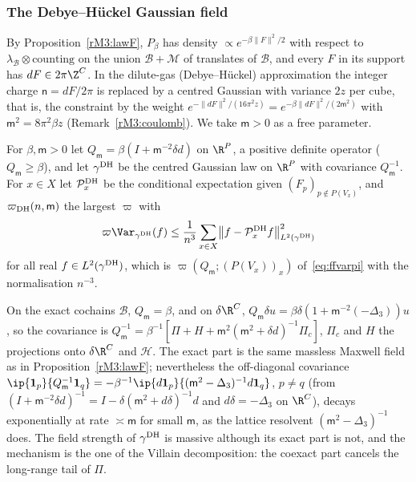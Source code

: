 \subsubsection{The Debye--H\"uckel Gaussian field}\label{rM3:DHsec}

By Proposition~\ref{rM3:lawF}, $P_\beta$ has density $\propto e^{-\beta
\lVert F\rVert^2/2}$ with respect to $\lambda_{\mathcal B}\otimes
\mathrm{counting}$ on the union $\mathcal B+\mathcal M$ of translates of
$\mathcal B$, and every $F$ in its support has $dF\in2\pi\Z^C$. In the dilute-gas (Debye--H\"uckel) approximation the
integer charge $\mathsf n=dF/2\pi$ is replaced by a centred Gaussian with
variance $2z$ per cube, that is, the constraint by the weight
$e^{-\lVert dF\rVert^2/(16\pi^2z)}=e^{-\beta\lVert dF\rVert^2/(2\mathsf m^2)}$
with $\mathsf m^2=8\pi^2\beta z$ (Remark~\ref{rM3:coulomb}). We take $\mathsf
m>0$ as a free parameter.

\begin{definition}\label{rM3:DHdef}
For $\beta,\mathsf m>0$ let $Q_{\mathsf m}=\beta(I+\mathsf m^{-2}\delta d)$
on $\R^P$, a positive definite operator ($Q_{\mathsf m}\ge\beta$), and let
$\gamma^{\rm DH}$ be the centred Gaussian law on $\R^P$ with covariance
$Q_{\mathsf m}^{-1}$. For $x\in X$ let $\mathcal P^{\rm DH}_x$ be the
conditional expectation given $(F_p)_{p\notin P(V_x)}$, and
$\varpi_{\rm DH}(n,\mathsf m)$ the largest $\varpi$ with
\[
\varpi\Var_{\gamma^{\rm DH}}(f)\le\frac1{n^3}\sum_{x\in X}\bigl\lVert f-
\mathcal P^{\rm DH}_xf\bigr\rVert^2_{L^2(\gamma^{\rm DH})}
\]
for all real $f\in L^2(\gamma^{\rm DH})$,
which is $\varpi(Q_{\mathsf m};(P(V_x))_x)$ of~\eqref{eq:ffvarpi} with the
normalisation $n^{-3}$.
\end{definition}

On the exact cochains $\mathcal B$, $Q_{\mathsf m}=\beta$, and on $\delta
\R^C$, $Q_{\mathsf m}\delta u=\beta\delta(1+\mathsf m^{-2}(-\Delta_3))u$, so
the covariance is $Q_{\mathsf m}^{-1}=\beta^{-1}[\Pi+H+\mathsf m^2(\mathsf m^2
+\delta d)^{-1}\Pi_c]$, $\Pi_c$ and $H$ the projections onto $\delta\R^C$
and $\mathcal H$. The
exact part is the same massless Maxwell field as in
Proposition~\ref{rM3:lawF}; nevertheless the off-diagonal covariance
$\ip{\mathbf 1_p}{Q_{\mathsf m}^{-1}\mathbf 1_q}=-\beta^{-1}\ip{d\mathbf 1_p}
{(\mathsf m^2-\Delta_3)^{-1}d\mathbf 1_q}$, $p\ne q$ (from $(I+\mathsf m^{-2}
\delta d)^{-1}=I-\delta(\mathsf m^2+d\delta)^{-1}d$ and $d\delta=-\Delta_3$
on $\R^C$), decays exponentially at rate $\asymp\mathsf m$ for small
$\mathsf m$, as the lattice resolvent $(\mathsf m^2-\Delta_3)^{-1}$ does.
The field strength of
$\gamma^{\rm DH}$ is massive although its exact part is not, and the
mechanism is the one of the Villain decomposition: the coexact part cancels
the long-range tail of $\Pi$.

